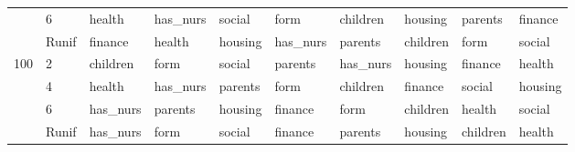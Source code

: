 \begin{table}[htbp]
\begin{tabular}{llllllllll}
 & 6 & health & has_nurs & social & form & children & housing & parents & finance \\
 & Runif & finance & health & housing & has_nurs & parents & children & form & social \\
\multirow[c]{4}{*}{100} & 2 & children & form & social & parents & has_nurs & housing & finance & health \\
 & 4 & health & has_nurs & parents & form & children & finance & social & housing \\
 & 6 & has_nurs & parents & housing & finance & form & children & health & social \\
 & Runif & has_nurs & form & social & finance & parents & housing & children & health \\
\bottomrule
\end{tabular}
\end{table}
